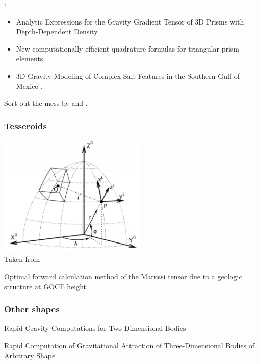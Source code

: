 \Literature:
\begin{itemize}
\item Analytic Expressions for the Gravity Gradient Tensor
of 3D Prisms with Depth-Dependent Density \cite{jilz18}
\item New computationally efficient quadrature formulas for triangular
prism elements \cite{kuym13}
\item 3D Gravity Modeling of Complex Salt Features in the Southern
Gulf of Mexico \cite{naoo16}.
\end{itemize}

\bscthesis {} Sort out the mess by \cite{duti16} and \cite{zhhu17}.



\subsubsection{Tesseroids}

\begin{center}
\includegraphics[width=7cm]{images/gravity/uibb11}\\
{\captionfont Taken from \cite{uibb11}}
\end{center}


Optimal forward calculation method of the Marussi tensor due to a geologic structure at GOCE height 
\cite{uibb11}

\subsubsection{Other shapes}

\Literature

Rapid Gravity Computations for Two-Dimensional Bodies \cite{tawl59}

Rapid Computation of Gravitational Attraction of Three-Dimensional Bodies of Arbitrary Shape
\cite{taew60}




